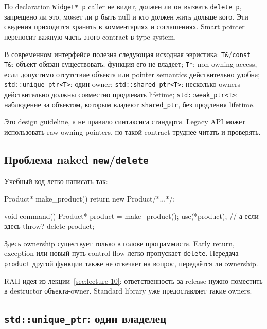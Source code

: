 \begin{whybox}
По declaration \texttt{Widget* p} caller не видит, должен ли он вызвать
\texttt{delete p}, запрещено ли это, может ли \texttt{p} быть null и кто должен
жить дольше кого. Эти сведения приходится хранить в комментариях и соглашениях.
Smart pointer переносит важную часть этого contract в type system.
\end{whybox}

В современном интерфейсе полезна следующая исходная эвристика:
\texttt{T\&}/\texttt{const T\&}: объект обязан существовать; функция его не владеет; \texttt{T*}: non-owning access, если допустимо отсутствие объекта или pointer semantics действительно удобна; \texttt{std::unique\_ptr<T>}: один owner; \texttt{std::shared\_ptr<T>}: несколько owners действительно должны совместно продлевать lifetime; \texttt{std::weak\_ptr<T>}: наблюдение за объектом, которым владеют \texttt{shared\_ptr}, без продления lifetime.

Это design guideline, а не правило синтаксиса стандарта. Legacy API может
использовать raw owning pointers, но такой contract труднее читать и проверять.

\subsection{Проблема naked \texttt{new}/\texttt{delete}}

Учебный код легко написать так:

\begin{cppcode}
Product* make_product() {
    return new Product{/*...*/};
}

void command() {
    Product* product = make_product();
    use(*product);               // а если здесь throw?
    delete product;
}
\end{cppcode}

Здесь ownership существует только в голове программиста. Early return,
exception или новый путь control flow легко пропускает \texttt{delete}.
Передача \texttt{product} другой функции также не отвечает на вопрос,
передаётся ли ownership.

RAII-идея из лекции~\ref{sec:lecture-10}: ответственность за release нужно
поместить в destructor объекта-owner. Standard library уже предоставляет такие
owners.

\subsection{\texttt{std::unique\_ptr}: один владелец}

